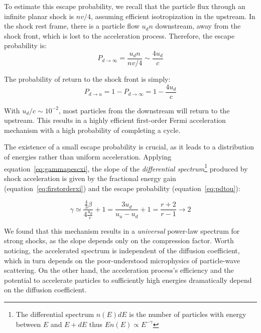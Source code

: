 To estimate this escape probability, we recall that the particle flux through an infinite planar shock is \( n v / 4 \), assuming efficient isotropization in the upstream. In the shock rest frame, there is a particle flow \( u_d n \) downstream, away from the shock front, which is lost to the acceleration process. Therefore, the escape probability is:
%
\begin{equation}
P_{d \rightarrow \infty} = \frac{u_d n}{n v / 4} \sim \frac{4 u_d}{c}
\end{equation}

The probability of return to the shock front is simply:
%
\begin{equation}\label{eq:pdtou}
P_{d \rightarrow u} = 1 - P_{d \rightarrow \infty} = 1 - \frac{4 u_d}{c}
\end{equation}

With \( u_d / c \sim 10^{-2} \), most particles from the downstream will return to the upstream. This results in a highly efficient first-order Fermi acceleration mechanism with a high probability of completing a cycle.

The existence of a small escape probability is crucial, as it leads to a distribution of energies rather than uniform acceleration. Applying equation~\eqref{eq:gammapescxi}, the slope of the \emph{differential spectrum}\footnote{The differential spectrum \( n(E)dE \) is  the number of particles with energy between \( E \) and \( E + dE \) thus \( E n(E) \propto E^{-\gamma} \)} produced by shock acceleration is given by the fractional energy gain (equation~\ref{eq:firstorderxi}) and the escape probability (equation~\ref{eq:pdtou}):
%
\begin{remark}
\begin{equation}
\gamma \simeq \frac{\frac{4}{3} \beta}{4 \frac{u_d}{c}} + 1 = \frac{3 u_d}{u_u - u_d} + 1 = \frac{r + 2}{r - 1} \rightarrow 2
\end{equation}
\end{remark}

We found that this mechanism results in a \emph{universal} power-law spectrum for strong shocks, as the slope depends only on the compression factor. Worth noticing, the accelerated spectrum is independent of the diffusion coefficient, which in turn depends on the poor-understood microphysics of particle-wave scattering.
%
On the other hand, the acceleration process's efficiency and the potential to accelerate particles to sufficiently high energies dramatically depend on the diffusion coefficient. 

